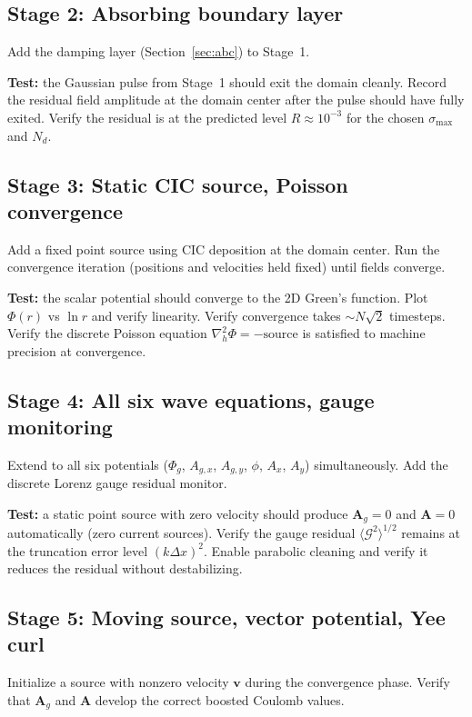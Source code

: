\documentclass[11pt,a4paper]{article}
\newcommand{\vv}[1]{\mathbf{#1}}
\newcommand{\Phig}{\Phi_g}
\newcommand{\Ag}{\vv{A}_g}
\begin{document}
\subsection{Stage 2: Absorbing boundary layer}

Add the damping layer (Section~\ref{sec:abc}) to Stage~1.

\textbf{Test:} the Gaussian pulse from Stage~1 should exit the domain cleanly.  Record the residual field amplitude at the domain center after the pulse should have fully exited.  Verify the residual is at the predicted level $R \approx 10^{-3}$ for the chosen $\sigma_{\max}$ and $N_d$.

\subsection{Stage 3: Static CIC source, Poisson convergence}

Add a fixed point source using CIC deposition at the domain center.  Run the convergence iteration (positions and velocities held fixed) until fields converge.

\textbf{Test:} the scalar potential should converge to the 2D Green's function.  Plot $\Phi(r)$ vs $\ln r$ and verify linearity.  Verify convergence takes $\sim N\sqrt{2}$ timesteps.  Verify the discrete Poisson equation $\nabla^2_{h}\Phi = -\mathrm{source}$ is satisfied to machine precision at convergence.

\subsection{Stage 4: All six wave equations, gauge monitoring}

Extend to all six potentials ($\Phig$, $A_{g,x}$, $A_{g,y}$, $\phi$, $A_x$, $A_y$) simultaneously.  Add the discrete Lorenz gauge residual monitor.

\textbf{Test:} a static point source with zero velocity should produce $\Ag = 0$ and $\vv{A} = 0$ automatically (zero current sources).  Verify the gauge residual $\langle\mathcal{G}^2\rangle^{1/2}$ remains at the truncation error level $(k\Delta x)^2$.  Enable parabolic cleaning and verify it reduces the residual without destabilizing.

\subsection{Stage 5: Moving source, vector potential, Yee curl}

Initialize a source with nonzero velocity $\vv{v}$ during the convergence phase.  Verify that $\Ag$ and $\vv{A}$ develop the correct boosted Coulomb values.
\end{document}
